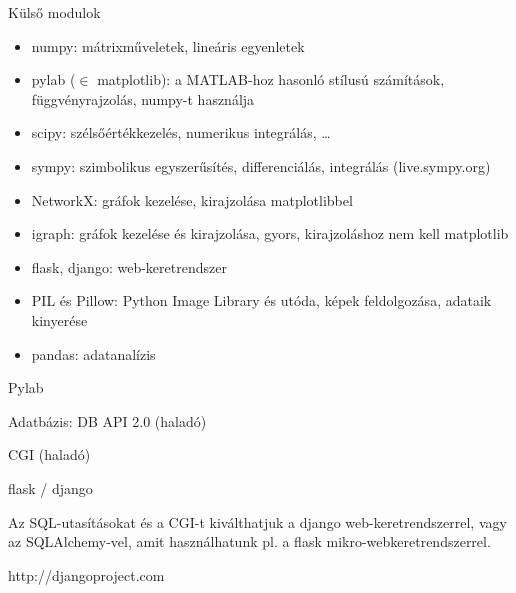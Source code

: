 \begin{frame}
  {Külső modulok}
  \begin{itemize}
    \item  numpy: mátrixműveletek, lineáris egyenletek
    \item  pylab ($\in$ matplotlib): a MATLAB-hoz hasonló stílusú
        számítások, függvényrajzolás, numpy-t használja
    \item  scipy: szélsőértékkezelés, numerikus integrálás, \ldots
    \item  sympy: szimbolikus egyszerűsítés, differenciálás, integrálás
	(live.sympy.org)
    \item  NetworkX: gráfok kezelése, kirajzolása matplotlibbel
    \item  igraph: gráfok kezelése és kirajzolása, gyors,
        kirajzoláshoz nem kell matplotlib
    \item  flask, django: web-keretrendszer
    \item  PIL és Pillow: Python Image Library és utóda, képek feldolgozása,
        adataik kinyerése
    \item pandas: adatanalízis
  \end{itemize}
\end{frame}

\begin{frame}[fragile]
  {Pylab}
      
\end{frame}

\begin{frame}[fragile]
  {Adatbázis: DB API 2.0 (haladó)}
      
\end{frame}

\begin{frame}[fragile]
  {CGI (haladó)}
      
\end{frame}

\begin{frame}
  {flask / django}

  Az SQL-utasításokat és a CGI-t kiválthatjuk a django
  web-keretrendszerrel, vagy az \alert{SQLAlchemy}-vel, amit használhatunk pl. a
  flask mikro-webkeretrendszerrel.

  http://djangoproject.com
\end{frame}

